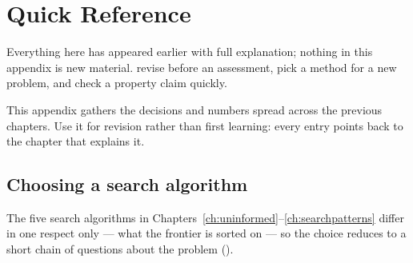 \chapter{Quick Reference}\label{ch:reference}

\chapterguide%
  {Everything here has appeared earlier with full explanation; nothing in this appendix is new material.}
  {revise before an assessment, pick a method for a new problem, and check a property claim quickly.}

This appendix gathers the decisions and numbers spread across the previous chapters. Use it
for revision rather than first learning: every entry points back to the chapter that explains
it.

\section{Choosing a search algorithm}

The five search algorithms in Chapters~\ref{ch:uninformed}--\ref{ch:searchpatterns} differ in
one respect only --- what the frontier is sorted on --- so the choice reduces to a short chain
of questions about the problem ().

